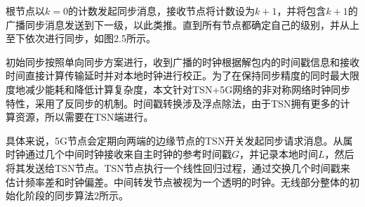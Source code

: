 \documentclass[UTF8,a4paper,12pt]{ctexart}
\numberwithin{equation}{section}
\begin{document}
	根节点以$k=0$的计数发起同步消息，接收节点将计数设为$k+1$，并将包含$k+1$的广播同步消息发送到下一级，以此类推。直到所有节点都确定自己的级别，并从上至下依次进行同步，如图2.5所示。
	
	初始同步按照单向同步方案进行，收到广播的时钟根据解包内的时间戳信息和接收时间直接计算传输延时并对本地时钟进行校正。为了在保持同步精度的同时最大限度地减少能耗和降低计算复杂度，本文针对TSN+5G网络的非对称网络时钟同步特性，采用了反同步的机制\cite{8935413}。时间戳转换涉及浮点除法，由于TSN拥有更多的计算资源，所以需要在TSN端进行。
	
	具体来说，5G节点会定期向两端的边缘节点的TSN开关发起同步请求消息。从属时钟通过几个中间时钟接收来自主时钟的参考时间戳$G$，并记录本地时间$L$，然后将其发送给TSN节点。TSN节点执行一个线性回归过程，通过交换几个时间戳来估计频率差和时钟偏差。中间转发节点被视为一个透明的时钟。无线部分整体的初始化阶段的同步算法2所示。
	
\end{document}
